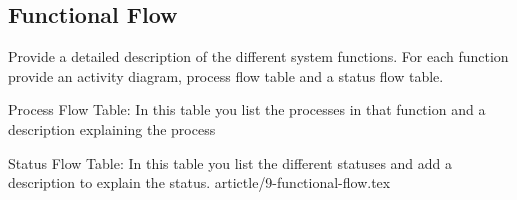 \subsection{Functional Flow}

Provide a detailed description of the different system functions. For each
function provide an activity diagram, process flow table and a status flow
table.

Process Flow Table: In this table you list the processes in that function and a
description explaining the process

Status Flow Table: In this table you list the different statuses and add a
description to explain the status.
artictle/9-functional-flow.tex
